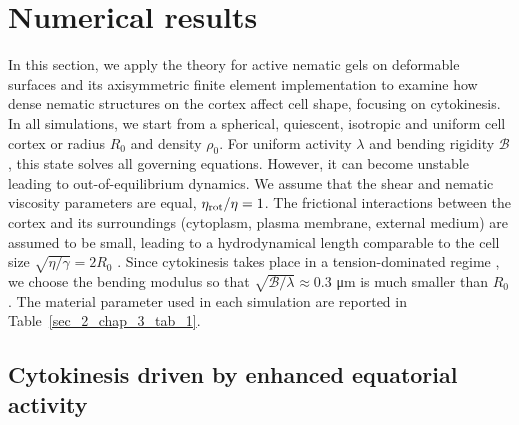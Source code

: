 {%

\section{Numerical results} \label{2_3_3}


In this section, we apply the theory for active nematic gels on deformable surfaces and its axisymmetric finite element implementation to examine how dense nematic structures on the cortex affect cell shape, focusing on cytokinesis. In all simulations, we start from a spherical, quiescent, isotropic and uniform cell cortex or radius $R_0$ and density $\rho_0$. For uniform activity $\lambda$ and bending rigidity $\mathcal{B}$, this state solves all governing equations. However, it can become unstable leading to out-of-equilibrium dynamics. We assume that the shear and nematic viscosity parameters are equal,  $\eta_{\rm rot}/\eta = 1$. The frictional interactions between the cortex and its surroundings (cytoplasm, plasma membrane, external medium) are assumed to be small, leading to a hydrodynamical length comparable to the cell size $\sqrt{\eta/\gamma} = 2R_0$ \cite{Saha2016}. Since cytokinesis  takes place in a tension-dominated regime \cite{turlier2014,mietke2019,turlier2021}, we choose the bending modulus so that $\sqrt{\mathcal{B}/\lambda} \approx 0.3$ \si{\micro \meter} is much smaller than $R_0$. The material parameter used in each simulation are reported in Table~\ref{sec_2_chap_3_tab_1}. 



\subsection{Cytokinesis driven by enhanced equatorial activity}


}
